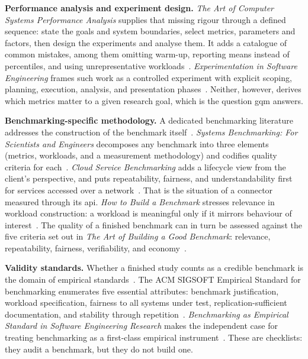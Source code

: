 \textbf{Performance analysis and experiment design.} \emph{The Art of Computer Systems Performance Analysis} supplies that missing rigour through a defined sequence: state the goals and system boundaries, select metrics, parameters and factors, then design the experiments and analyse them. It adds a catalogue of common mistakes, among them omitting warm-up, reporting means instead of percentiles, and using unrepresentative workloads~\citep{jain1991art}. \emph{Experimentation in Software Engineering} frames such work as a controlled experiment with explicit scoping, planning, execution, analysis, and presentation phases~\citep{wohlin2012experimentation}. Neither, however, derives which metrics matter to a given research goal, which is the question \gls{gqm} answers.

\textbf{Benchmarking-specific methodology.} A dedicated benchmarking literature addresses the construction of the benchmark itself~\citep{kounev2020systems, bermbach2017cloud}. \emph{Systems Benchmarking: For Scientists and Engineers} decomposes any benchmark into three elements (metrics, workloads, and a measurement methodology) and codifies quality criteria for each~\citep{kounev2020systems}. \emph{Cloud Service Benchmarking} adds a lifecycle view from the client's perspective, and puts repeatability, fairness, and understandability first for services accessed over a network~\citep{bermbach2017cloud}. That is the situation of a connector measured through its \gls{api}. \emph{How to Build a Benchmark} stresses relevance in workload construction: a workload is meaningful only if it mirrors behaviour of interest~\citep{kistowski2015benchmark}. The quality of a finished benchmark can in turn be assessed against the five criteria set out in \emph{The Art of Building a Good Benchmark}: relevance, repeatability, fairness, verifiability, and economy~\citep{huppler2009art}.

\textbf{Validity standards.} Whether a finished study counts as a credible benchmark is the domain of empirical standards~\citep{Ralph2020, hasselbring2021benchmarking}. The ACM SIGSOFT Empirical Standard for benchmarking enumerates five essential attributes: benchmark justification, workload specification, fairness to all systems under test, replication-sufficient documentation, and stability through repetition~\citep{Ralph2020, empiricalStandardsBenchmarking}. \emph{Benchmarking as Empirical Standard in Software Engineering Research} makes the independent case for treating benchmarking as a first-class empirical instrument~\citep{hasselbring2021benchmarking}. These are checklists: they audit a benchmark, but they do not build one.

